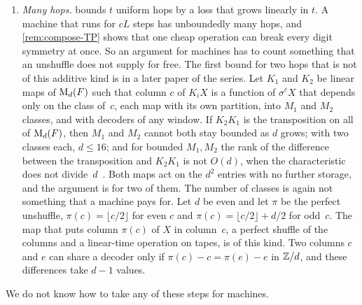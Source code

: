 \begin{enumerate}[leftmargin=2em]
decoders when they see the whole matrix, and a statement for machines has to use that the cones a genie leaves are of
bounded size (\cref{sec:sets,prob:machines}).
\item \emph{Many hops.}  bounds $t$ uniform hops by a loss that grows linearly in $t$. A machine
that runs for $cL$ steps has unboundedly many hops, and \cref{rem:compose-TP} shows that one cheap operation can break
every digit symmetry at once. So an argument for machines has to count something that an unshuffle does not supply for free.
The first bound for two hops that is not of this additive kind is in a later paper of the series. Let $K_1$ and $K_2$
be linear maps of $\mathrm{M}_d(F)$ such that column $c$ of $K_iX$ is a function of $\sigma^cX$ that depends only on the
class of~$c$, each map with its own partition, into $M_1$ and $M_2$ classes, and with decoders of any window. If
$K_2K_1$ is the transposition on all of $\mathrm{M}_d(F)$, then $M_1$ and $M_2$ cannot both stay bounded as $d$ grows; with
two classes each, $d\le16$; and for bounded $M_1,M_2$ the rank of the difference between the transposition and
$K_2K_1$ is not $O(d)$, when the characteristic does not divide~$d$~\cite[Theorem~6.3, Corollary~6.4 and
Theorem~6.6]{SharedDecoders2026}. Both maps act on the $d^2$ entries with no further storage, and the argument is for
two of them. The number of classes is again not something that a machine pays for. Let $d$ be even and let $\pi$ be
the perfect unshuffle, $\pi(c)=\lfloor c/2\rfloor$ for even $c$ and $\pi(c)=\lfloor c/2\rfloor+d/2$ for odd~$c$.
The map that puts column $\pi(c)$ of $X$ in column~$c$, a perfect shuffle of the columns and a linear-time operation
on tapes, is of this kind. Two columns $c$ and $e$ can share a decoder only if $\pi(c)-c=\pi(e)-e$ in $\mathbb{Z}/d$, and
these differences take $d-1$ values.
\end{enumerate}
We do not know how to take any of these steps for machines.
